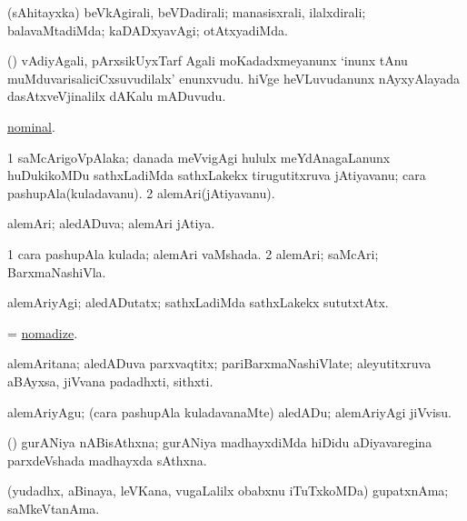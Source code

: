 \bentry
{}
\gl{\kirxvi}
\expl{\Latin}
\bmng
(sAhitayxka) beVkAgirali, beVDadirali; manasisxrali, ilalxdirali; balavaMtadiMda; kaDADxyavAgi; otAtxyadiMda. 
\emng
\eentry

\bentry
{}
\gl{\nA}
\expl{\Latin}
\bmng
(\nAyxshA) 
\banum
{} vAdiyAgali, pArxsikUyxTarf Agali moKadadxmeyanunx `inunx tAnu muMduvarisaliciCxsuvudilalx' enunxvudu. 
 hiVge heVLuvudanunx nAyxyAlayada dasAtxveVjinalilx dAKalu mADuvudu. 
\eanum
\emng
\eentry

\bentry
{}
\gl{\saMkiSx}
\bmng
\hyperlink{nominal}{nominal}. 
\emng
\eentry

\bentry
{}
\gl{\nA}
\bmng
\bnum
\num{1} saMcArigoVpAlaka; danada meVvigAgi hululx meYdAnagaLanunx huDukikoMDu sathxLadiMda sathxLakekx tirugutitxruva jAtiyavanu; cara pashupAla(kuladavanu). 
\num{2} alemAri(jAtiyavanu). 
\enum
\emng
\eentry

\bentry
{}
\gl{\gu}
\bmng
alemAri; aledADuva; alemAri jAtiya. 
\emng
\eentry

\bentry
{}
\gl{\gu}
\bmng
\bnum
\num{1} cara pashupAla kulada; alemAri vaMshada. 
\num{2} alemAri; saMcAri; BarxmaNashiVla. 
\enum
\emng
\eentry

\bentry
{}
\gl{\kirxvi}
\bmng
alemAriyAgi; aledADutatx; sathxLadiMda sathxLakekx sututxtAtx. 
\emng
\eentry

\bentry
{}
\gl{\akirx}
\bmng
= \hyperlink{nomadize}{nomadize}. 
\emng
\eentry

\bentry
{}
\gl{\nA}
\bmng
alemAritana; aledADuva parxvaqtitx; pariBarxmaNashiVlate; aleyutitxruva aBAyxsa, jiVvana padadhxti, sithxti. 
\emng
\eentry

\bentry
{}
\gl{\akirx}
\bmng
alemAriyAgu; (cara pashupAla kuladavanaMte) aledADu; alemAriyAgi jiVvisu. 
\emng
\eentry

\bentry
{}
\gl{\nA}
\bmng
(\vaMlAM) gurANiya nABisAthxna; gurANiya madhayxdiMda hiDidu aDiyavaregina parxdeVshada madhayxda sAthxna. 
\emng
\eentry

\bentry
{}
\gl{\nA}
\bmng
(yudadhx, aBinaya, leVKana, \mo vugaLalilx obabxnu iTuTxkoMDa) gupatxnAma; saMkeVtanAma. 
\emng
\eentry


